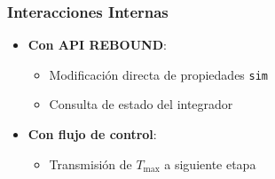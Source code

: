 \subsubsection{Interacciones Internas}
\begin{itemize}
    \item \textbf{Con API REBOUND}:
    \begin{itemize}
        \item Modificación directa de propiedades \texttt{sim}
        \item Consulta de estado del integrador
    \end{itemize}
    \item \textbf{Con flujo de control}:
    \begin{itemize}
        \item Transmisión de $T_{\text{max}}$ a siguiente etapa
    \end{itemize}
\end{itemize}

